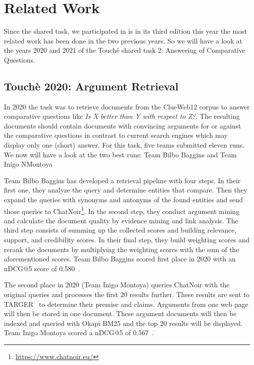 \section{Related Work}

Since the shared task, we participated in is in its third edition this year the most related work has been done in the two previous years.
So we will have a look at the years 2020 and 2021 of the Touché shared task 2: Answering of Comparative Questions.

\subsection{Touchè 2020: Argument Retrieval}

In 2020 the task was to retrieve documents from the ClueWeb12 corpus to answer comparative questions like \textit{Is X better than Y with respect to Z?}.
The resulting documents should contain documents with convincing arguments for or against the comparative questions in contrast to current search engines which may display only one (short) answer.
For this task, five teams submitted eleven runs.
We now will have a look at the two best runs: Team Bilbo Baggins and Team Inigo NMontoya~\cite{BondarenkoFBGAPBSWPH2020}

Team Bilbo Baggins has developed a retrieval pipeline with four steps.
In their first one, they analyze the query and determine entities that compare.
Then they expand the queries with synonyms and antonyms of the found entities and send those queries to ChatNoir\footnote{\url{https://www.chatnoir.eu/}}.
In the second step, they conduct argument mining and calculate the document quality by evidence mining and link analysis.
The third step consists of summing up the collected scores and building relevance, support, and credibility scores.
In their final step, they build weighting scores and rerank the documents by multiplying the weighting scores with the sum of the aforementioned scores.
Team Bilbo Baggins scored first place in 2020 with an nDCG@5 score of 0.580~\cite{AbyeST2020}.

The second place in 2020 (Team Inigo Montoya) queries ChatNoir with the original queries and processes the first 20 results further.
These results are sent to TARGER~\cite{ChernodubOHBHBP2019} to determine their premise and claims.
Arguments from one web page will then be stored in one document.
These argument documents will then be indexed and queried with Okapi BM25 and the top 20 results will be displayed.
Team Inigo Montoya scored a nDCG@5 of 0.567~\cite{Huck2020}.


